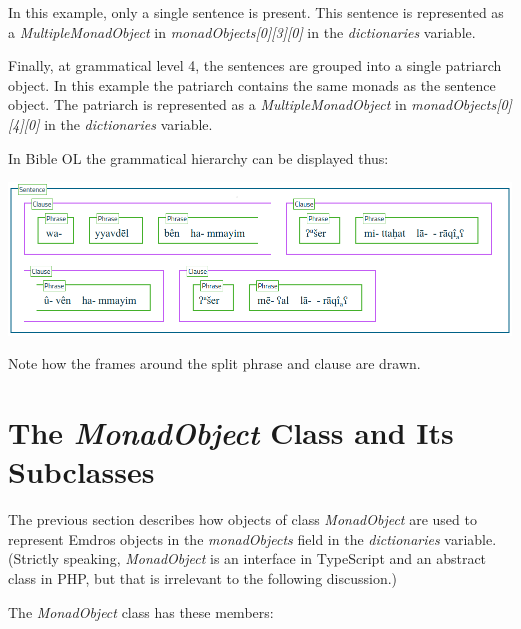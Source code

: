 \documentclass[11pt,oneside,a4paper]{memoir}
\begin{document}
In this example, only a single sentence is present.
This sentence is represented as a \emph{MultipleMonadObject} in \emph{monadObjects[0][3][0]} in the
\emph{dictionaries} variable.

Finally, at grammatical level 4, the sentences are grouped into a single
patriarch object. In this example the patriarch contains the same monads as the
sentence object. The patriarch is represented as a \emph{MultipleMonadObject} in
\emph{monadObjects[0][4][0]} in the \emph{dictionaries} variable.


In Bible OL the grammatical hierarchy can be displayed thus:

\begin{center}
  \includegraphics[width=1.0\textwidth]{gen1_7.png}
\end{center}

Note how the frames around the split phrase and clause are drawn.

\section{The \emph{MonadObject} Class and Its Subclasses}%
\label{MonadObject}

The previous section describes how objects of class \emph{MonadObject} are used to represent Emdros
objects in the \emph{monadObjects} field in the \emph{dictionaries} variable. (Strictly speaking,
\emph{MonadObject} is an interface in TypeScript and an abstract class in PHP, but that is
irrelevant to the following discussion.)

The \emph{MonadObject} class has these members:
\end{document}
